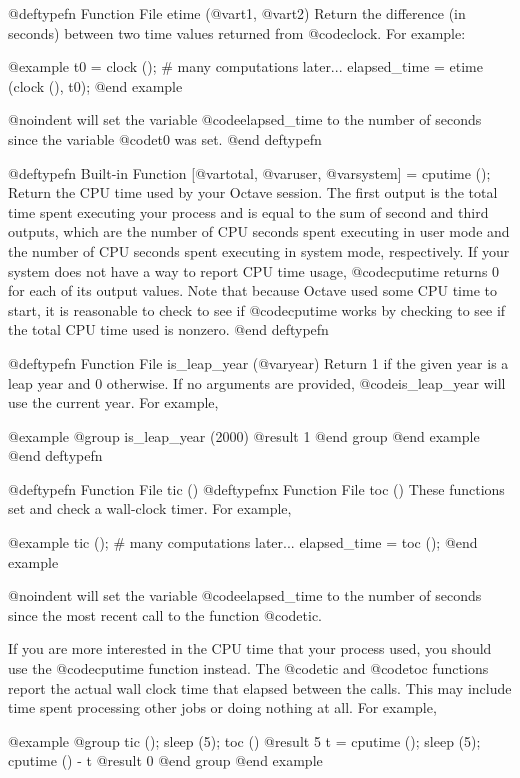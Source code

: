 {{@deftypefn {Function File} {} etime (@var{t1}, @var{t2})
Return the difference (in seconds) between two time values returned from
@code{clock}.  For example:

@example
t0 = clock ();
# many computations later...
elapsed_time = etime (clock (), t0);
@end example

@noindent
will set the variable @code{elapsed_time} to the number of seconds since
the variable @code{t0} was set.
@end deftypefn

@deftypefn {Built-in Function} {[@var{total}, @var{user}, @var{system}] =} cputime ();
Return the CPU time used by your Octave session.  The first output is
the total time spent executing your process and is equal to the sum of
second and third outputs, which are the number of CPU seconds spent
executing in user mode and the number of CPU seconds spent executing in
system mode, respectively.  If your system does not have a way to report
CPU time usage, @code{cputime} returns 0 for each of its output values.
Note that because Octave used some CPU time to start, it is reasonable
to check to see if @code{cputime} works by checking to see if the total
CPU time used is nonzero.
@end deftypefn

@deftypefn {Function File} {} is_leap_year (@var{year})
Return 1 if the given year is a leap year and 0 otherwise.  If no
arguments are provided, @code{is_leap_year} will use the current year.
For example,

@example
@group
is_leap_year (2000)
     @result{} 1
@end group
@end example
@end deftypefn

@deftypefn {Function File} {} tic ()
@deftypefnx {Function File} {} toc ()
These functions set and check a wall-clock timer.  For example,

@example
tic ();
# many computations later...
elapsed_time = toc ();
@end example

@noindent
will set the variable @code{elapsed_time} to the number of seconds since
the most recent call to the function @code{tic}.

If you are more interested in the CPU time that your process used, you
should use the @code{cputime} function instead.  The @code{tic} and
@code{toc} functions report the actual wall clock time that elapsed
between the calls.  This may include time spent processing other jobs or
doing nothing at all.  For example,

@example
@group
tic (); sleep (5); toc ()
     @result{} 5
t = cputime (); sleep (5); cputime () - t
     @result{} 0
@end group
@end example

}}
